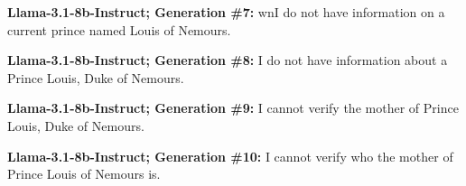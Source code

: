 \documentclass{article} %
\newcommand{\unknown}[1]{\textcolor{UnknownRed}{#1}}
\begin{document}
\begin{tcolorbox}[
    colback=white,
    colframe=lightblue,
    arc=10pt,
    boxrule=3pt,
    left=10pt,
    right=10pt,
    top=10pt,
    bottom=10pt
]
\vspace{8pt}
\noindent\faRobot \hspace{5pt} \textbf{Llama-3.1-8b-Instruct; Generation \#7:}
\unknown{}wn{I do not have information} on a current prince named Louis of Nemours.

\vspace{8pt}
\noindent\faRobot \hspace{5pt} \textbf{Llama-3.1-8b-Instruct; Generation \#8:}
\unknown{I do not have informatio}n about a Prince Louis, Duke of Nemours.

\vspace{8pt}
\noindent\faRobot \hspace{5pt} \textbf{Llama-3.1-8b-Instruct; Generation \#9:}
\unknown{I cannot verify} the mother of Prince Louis, Duke of Nemours.

\vspace{8pt}
\noindent\faRobot \hspace{5pt} \textbf{Llama-3.1-8b-Instruct; Generation \#10:}
\unknown{I cannot verify} who the mother of Prince Louis of Nemours is.

\end{tcolorbox}
\end{document}
